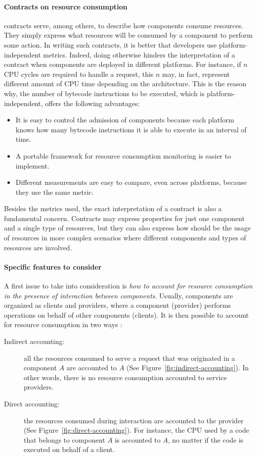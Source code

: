 \paragraph{Contracts on resource consumption}
 contracts serve, among others, to describe how components consume resources.
They simply express what resources will be consumed by a component to perform some action. 
In writing such contracts, it is better that developers use platform-independent metrics.
Indeed, doing otherwise hinders the interpretation of a contract when components are deployed in different platforms.
For instance, if $n$ CPU cycles are required to handle a request, this $n$ may, in fact, represent different amount of CPU time depending on the architecture.
This is the reason why, the number of bytecode instructions to be executed, which is platform-independent, offers the following advantages:
\begin{itemize}
\item It is easy to control the admission of components because each platform knows how many bytecode instructions it is able to execute in an interval of time.
\item A portable framework for resource consumption monitoring is easier to implement.
\item Different measurements are easy to compare, even across platforms, because they use the same metric.
\end{itemize}
Besides the metrics used, the exact interpretation of a contract is also a fundamental concern.
Contracts may express properties for just one component and a single type of resources, but they can also express how should be the usage of resources in more complex scenarios where different components and types of resources are involved.

\paragraph{Specific features to consider}
A first issue to take into consideration is \textit{how to account for resource consumption in the presence of interaction between components}.
Usually, components are organized as clients and providers, where a component (provider) performs operations on behalf of other components (clients).
It is then possible to account for resource consumption in two ways \cite{Miettinen2008,Maurel:2012:AME:2304736.2304763}:

\begin{description}

\item[Indirect accounting:] all the resources consumed to serve a request that was originated in a component $A$ are accounted to $A$ (See Figure~\ref{fig:indirect-accounting}).
In other words, there is no resource consumption accounted to service providers.

\item[Direct accounting:] the resources consumed during
interaction are accounted to the provider (See Figure~\ref{fig:direct-accounting}).
For instance, the CPU used by a code that belongs
to component $A$ is accounted to $A$, no matter if the code is executed on behalf of a client.
\end{description}

